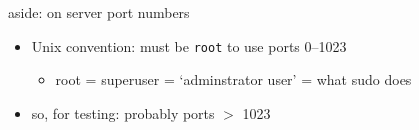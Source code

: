 \begin{frame}{aside: on server port numbers}
    \begin{itemize}
    \item Unix convention: must be \texttt{root} to use ports 0--1023
        \begin{itemize}
        \item root = superuser = `adminstrator user' = what sudo does
        \end{itemize}
    \item so, for testing: probably ports $>$ 1023
    \end{itemize}
\end{frame}
